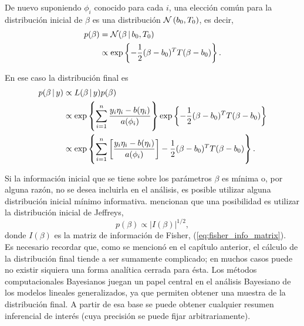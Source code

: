 De nuevo suponiendo $\phi_i$ conocido para cada $i$, una elección común para la distribución inicial de $\beta$ \citep{glm_bayesian_view, notas_glm_lnieto} es una distribución $\mathcal{N} \left( b_0, T_0 \right)$, es decir,
\begin{align} \label{glm_inicial}
	p(\beta) &= \mathcal{N} (\beta \, | \, b_0, T_0) \nonumber \\
    		 &\propto \mathrm{exp} \left\{ -\frac{1}{2} (\beta - b_0)^T T (\beta - b_0) \right\}.
\end{align}

En ese caso la distribución final es
\begin{align} \label{glm_final}
	p(\beta \, | \, y) &\propto L(\beta \, | \, y) p(\beta) \nonumber \\
    	&\propto \mathrm{exp} \left\{ \sum_{i=1}^{n} \frac{y_i\eta_i - b(\eta_i)}{a(\phi_i)} \right\} \mathrm{exp} \left\{ -\frac{1}{2} (\beta - b_0)^T T (\beta - b_0) \right\} \nonumber \\
        &\propto \mathrm{exp} \left\{ \sum_{i=1}^{n} \left[ \frac{y_i\eta_i - b(\eta_i)}{a(\phi_i)} \right] -\frac{1}{2} (\beta - b_0)^T T (\beta - b_0) \right\}.
\end{align}

Si la información inicial que se tiene sobre los parámetros $\beta$ es mínima o, por alguna razón, no se desea incluirla en el análisis, es posible utilizar alguna distribución inicial mínimo informativa. \citet[Capítulo 2.2]{glm_bayesian_view} mencionan que una posibilidad es utilizar la distribución inicial de Jeffreys,
\begin{equation}
	p(\beta) \propto \left| I(\beta) \right|^{1/2},
\end{equation}
donde $I(\beta)$ es la matriz de información de Fisher, (\ref{eq:fisher_info_matrix}). \\



Es necesario recordar que, como se mencionó en el capítulo anterior, el cálculo de la distribución final tiende a ser sumamente complicado; en muchos casos puede no existir siquiera una forma analítica cerrada para ésta. Los métodos computacionales Bayesianos juegan un papel central en el análisis Bayesiano de los modelos lineales generalizados, ya que permiten obtener una muestra de la distribución final. A partir de esa base se puede obtener cualquier resumen inferencial de interés (cuya precisión se puede fijar arbitrariamente). \\




